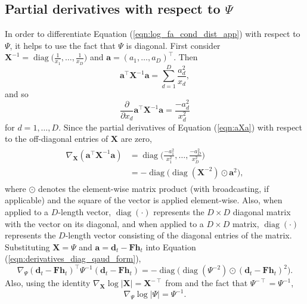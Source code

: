 \documentclass[msc,deptreport.inf]{infthesis} %
\newcommand{\matr}[1]{\mathbf{#1}}
\newcommand{\diag}{\mathop{\mathrm{diag}}}
\begin{document}
\subsection{Partial derivatives with respect to $\Psi$}

In order to differentiate Equation (\ref{eqn:log_fa_cond_dist_app}) with respect to $\Psi$, it helps to use the fact that $\Psi$ is diagonal. First consider $\matr{X}^{-1} = \diag\big(\frac{1}{x_1}, \dots, \frac{1}{x_D}\big)$ and $\matr{a} = (a_1, \dots, a_D)^\intercal$. Then 
\begin{equation}\label{eqn:aXa}
	\matr{a}^\intercal \matr{X}^{-1} \matr{a} = \sum_{d=1}^D \frac{a_d^2}{x_d},
\end{equation}
and so
\begin{equation}
	\frac{\partial}{\partial x_d} \matr{a}^\intercal \matr{X}^{-1} \matr{a} = \frac{-a_d^2}{x_d^2}
\end{equation}
for $d=1, \dots, D$. Since the partial derivatives of Equation (\ref{eqn:aXa}) with respect to the off-diagonal entries of $\matr{X}$ are zero, 
\begin{align}\label{eqn:derivatives_diag_qaud_form}
\begin{split}
	\nabla_\matr{X} (\matr{a}^\intercal \matr{X}^{-1} \matr{a}) 
	& = \diag\Big({\frac{-a_1^2}{x_1^2}, \dots, \frac{-a_D^2}{x_D^2}}\Big) \\
	& = -\diag\big(\diag(\matr{X}^{-2}) \odot \matr{a}^2\big),
\end{split}
\end{align}  
where $\odot$ denotes the element-wise matrix product (with broadcasting, if applicable) and the square of the vector is applied element-wise. Also, when applied to a $D$-length vector, $\diag(\cdot)$ represents the $D \times D$ diagonal matrix with the vector on its diagonal, and when applied to a $D \times D$ matrix, $\diag(\cdot)$ represents the $D$-length vector consisting of the diagonal entries of the matrix. Substituting $\matr{X} = \Psi$ and $\matr{a} = \matr{d}_t - \matr{Fh}_t$ into Equation (\ref{eqn:derivatives_diag_qaud_form}),
\begin{equation}\label{eqn:derivatives_wrt_Psi_1}
	\nabla_\Psi (\matr{d}_t - \matr{Fh}_t)^\intercal \Psi^{-1} (\matr{d}_t - \matr{Fh}_t) 
	= -\diag\big(\diag(\Psi^{-2}) \odot (\matr{d}_t - \matr{Fh}_t)^2\big).
\end{equation}
Also, using the identity $\nabla_\matr{X} \log |\matr{X}| = \matr{X}^{-\intercal}$ from \cite{petersen2012} and the fact that $\Psi^{-\intercal} = \Psi^{-1}$, 
\begin{equation}\label{eqn:derivatives_wrt_Psi_2}
	\nabla_\Psi \log |\Psi|
	= \Psi^{-1}.
\end{equation}
\end{document}
